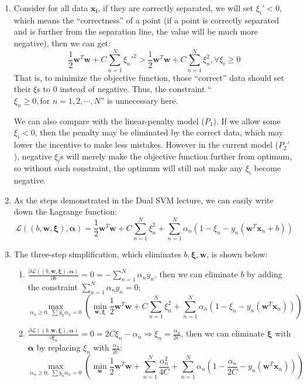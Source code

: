 \documentclass[11pt]{article}
\begin{document}
\begin{enumerate}[label=\textbf{\arabic*}.]
	\item Consider for all data $\mathbf{x_i}$, if they are correctly separated, we will set $\xi_i' < 0$, which means the ``correctness'' of a point (if a point is correctly separated and is further from the separation line, the value will be much more negative), then we can get:
	\[\frac{1}{2}\mathbf{w}^T\mathbf{w}+C\sum_{n=1}^N\xi_n'^2 > \frac{1}{2}\mathbf{w}^T\mathbf{w}+C\sum_{n=1}^N\xi_n^2, \forall\xi_i \geq 0\]
	That is, to minimize the objective function, those ``correct'' data should set their $\xi$s to $0$ instead of negative. Thus, the constraint ``$\xi_n \geq 0, \text{for } n = 1, 2, \cdots,N$'' is unnecessary here.\par 
	We can also compare with the linear-penalty model ($P_1$). If we allow some $\xi_i < 0$, then the penalty may be eliminated by the correct data, which may lower the incentive to make less mistakes. However in the current model ($P_2'$), negative $\xi_i$s will merely make the objective function further from optimum, so without such constraint, the optimum will still not make any $\xi_i$ become negative.
	
	\item As the steps demonstrated in the Dual SVM lecture, we can easily write down the Lagrange function:
	\[\mathcal{L}((b, \mathbf{w}, \bm{\xi}), \bm{\alpha}) = \frac{1}{2}\mathbf{w}^T\mathbf{w}+C\sum_{n=1}^N \xi_n^2 + \sum_{n=1}^N\alpha_n (1-\xi_n - y_n (\mathbf{w}^T\mathbf{x}_n+b))\]
	
	\item The three-step simplification, which eliminates $b, \bm{\xi}, \mathbf{w}$, is shown below:
	\begin{enumerate}
		\item $\frac{\partial\mathcal{L}((b, \mathbf{w}, \bm{\xi}), \bm{\alpha})}{\partial b} = 0 = -\sum_{n=1}^N\alpha_n y_n$, then we can eliminate $b$ by adding the constraint $\sum_{n=1}^N\alpha_n y_n = 0$:
		\[\underset{\alpha_n \geq 0,\ \sum y_n \alpha_n = 0}\max \left( \underset{\mathsf{\mathbf{w}, \bm{\xi}}}\min \frac{1}{2}\mathbf{w}^T\mathbf{w}+C\sum_{n=1}^N \xi_n^2 + \sum_{n=1}^N\alpha_n (1-\xi_n - y_n (\mathbf{w}^T\mathbf{x}_n)) \right)\]
		
		\item $\frac{\partial\mathcal{L}((b, \mathbf{w}, \bm{\xi}), \bm{\alpha})}{\partial \xi_n} = 0 = 2C\xi_n - \alpha_n \Rightarrow \xi_n = \frac{\alpha_n}{2C}$, then we can eliminate $\bm{\xi}$ with $\bm{\alpha}$ by replacing $\xi_n$ with $\frac{\alpha_n}{2C}$:
		\[\underset{\alpha_n \geq 0,\ \sum y_n \alpha_n = 0}\max \left( \underset{\mathsf{\mathbf{w}}}\min \frac{1}{2}\mathbf{w}^T\mathbf{w}+\sum_{n=1}^N \frac{\alpha_n^2}{4C} + \sum_{n=1}^N\alpha_n (1- \frac{\alpha_n}{2C} - y_n (\mathbf{w}^T\mathbf{x}_n)) \right)\]
		

\end{enumerate}
\end{enumerate}
\end{document}
